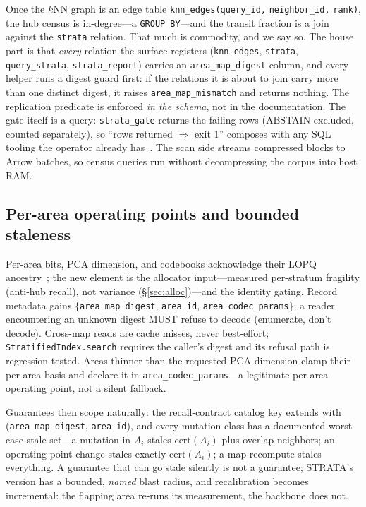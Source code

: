 \documentclass[sigconf, nonacm]{acmart}
\begin{document}
Once the $k$NN graph is an edge table
\texttt{knn\_edges(query\_id,} \texttt{neighbor\_id,} \texttt{rank)}, the
hub census is
in-degree---a \texttt{GROUP BY}---and the transit fraction is a join
against the \texttt{strata} relation. That much is commodity, and we say
so. The house part is that \emph{every} relation the surface registers
(\texttt{knn\_edges}, \texttt{strata}, \texttt{query\_strata},
\texttt{strata\_report}) carries an \texttt{area\_map\_digest} column, and
every helper runs a digest guard first: if the relations it is about to
join carry more than one distinct digest, it raises
\texttt{area\_map\_mismatch} and returns nothing. The replication
predicate is enforced \emph{in the schema}, not in the documentation.
The gate itself is a query: \texttt{strata\_gate} returns the failing
rows (ABSTAIN excluded, counted separately), so ``rows returned
$\Rightarrow$ exit 1'' composes with any SQL tooling the operator already
has~\cite{raasveldt2019duckdb}. The scan side streams compressed blocks
to Arrow batches, so census queries run without decompressing the corpus
into host RAM.

\subsection{Per-area operating points and bounded staleness}
\label{sec:opoints}

Per-area bits, PCA dimension, and codebooks acknowledge their LOPQ
ancestry~\cite{kalantidis2014lopq}; the new element is the allocator
input---measured per-stratum fragility (anti-hub recall), not variance
(\S\ref{sec:alloc})---and the identity gating. Record metadata gains
$\{$\texttt{area\_map\_digest}, \texttt{area\_id},
\texttt{area\_codec\_params}$\}$; a reader encountering an unknown digest
MUST refuse to decode (enumerate, don't decode). Cross-map reads are cache
misses, never best-effort; \texttt{StratifiedIndex.search} requires the
caller's digest and its refusal path is regression-tested. Areas thinner
than the requested PCA dimension clamp their per-area basis and declare it
in \texttt{area\_codec\_params}---a legitimate per-area operating point,
not a silent fallback.

Guarantees then scope naturally: the recall-contract catalog key extends
with (\texttt{area\_map\_digest}, \texttt{area\_id}), and every mutation
class has a documented worst-case stale set---a mutation in $A_i$ stales
$\mathrm{cert}(A_i)$ plus overlap neighbors; an operating-point change
stales exactly $\mathrm{cert}(A_i)$; a map recompute stales everything. A
guarantee that can go stale silently is not a guarantee; STRATA's version
has a bounded, \emph{named} blast radius, and recalibration becomes
incremental: the flapping area re-runs its measurement, the backbone does
not.
\end{document}
